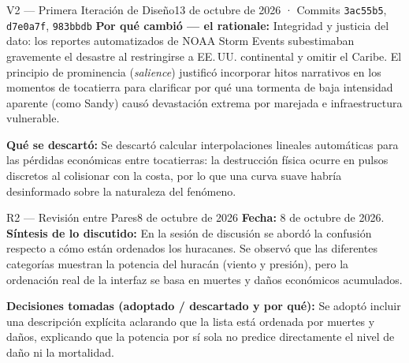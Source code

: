 \documentclass[11pt,a4paper]{article}
\begin{document}
\begin{versionbox}{V2 — Primera Iteración de Diseño}{13 de octubre de 2026 · Commits \texttt{3ac55b5}, \texttt{d7e0a7f}, \texttt{983bbdb}}
		\vspace{0.15cm}
		\noindent\textbf{Por qué cambió — el rationale:}
		Integridad y justicia del dato: los reportes automatizados de NOAA Storm Events subestimaban gravemente el desastre al restringirse a EE.\,UU. continental y omitir el Caribe. El principio de prominencia (\textit{salience}) justificó incorporar hitos narrativos en los momentos de tocatierra para clarificar por qué una tormenta de baja intensidad aparente (como Sandy) causó devastación extrema por marejada e infraestructura vulnerable.
		
		\vspace{0.15cm}
		\noindent\textbf{Qué se descartó:}
		Se descartó calcular interpolaciones lineales automáticas para las pérdidas económicas entre tocatierras: la destrucción física ocurre en pulsos discretos al colisionar con la costa, por lo que una curva suave habría desinformado sobre la naturaleza del fenómeno.
	\end{versionbox}
	
	\vspace{0.4cm}
	
	\begin{revisionbox}{R2 — Revisión entre Pares}{8 de octubre de 2026}
		\noindent\textbf{Fecha:} 8 de octubre de 2026.\\
		\textbf{Síntesis de lo discutido:} En la sesión de discusión se abordó la confusión respecto a cómo están ordenados los huracanes. Se observó que las diferentes categorías muestran la potencia del huracán (viento y presión), pero la ordenación real de la interfaz se basa en muertes y daños económicos acumulados.
		
		\vspace{0.15cm}
		\noindent\textbf{Decisiones tomadas (adoptado / descartado y por qué):}
		Se adoptó incluir una descripción explícita aclarando que la lista está ordenada por muertes y daños, explicando que la potencia por sí sola no predice directamente el nivel de daño ni la mortalidad.
	\end{revisionbox}
	
	\vspace{0.4cm}
	
\end{document}

